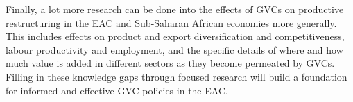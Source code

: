 \documentclass[a4paper]{article}
\begin{document}
Finally, a lot more research can be done into the effects of GVCs on productive restructuring in the EAC and Sub-Saharan African economies more generally. This includes effects on product and export diversification and competitiveness, labour productivity and employment, and the specific details of where and how much value is added in different sectors as they become permeated by GVCs. Filling in these knowledge gaps through focused research will build a foundation for informed and effective GVC policies in the EAC. 



\newpage


\end{document}
